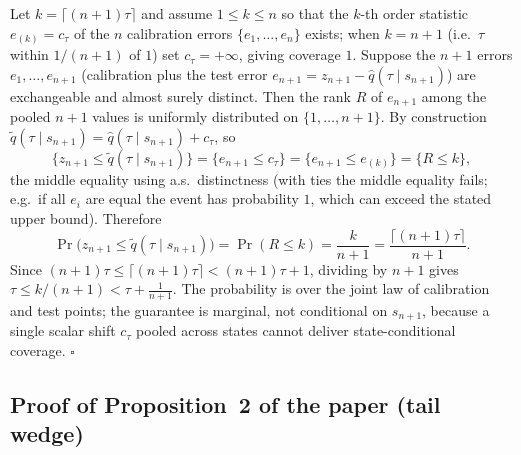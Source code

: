 \documentclass[11pt]{article}
\begin{document}
Let $k=\lceil(n{+}1)\tau\rceil$ and assume $1\le k\le n$ so that the
$k$-th order statistic $e_{(k)}=c_\tau$ of the $n$ calibration errors
$\{e_1,\dots,e_n\}$ exists; when $k=n+1$ (i.e.\ $\tau$ within $1/(n+1)$
of $1$) set $c_\tau=+\infty$, giving coverage $1$. Suppose the $n+1$
errors $e_1,\dots,e_{n+1}$ (calibration plus the test error
$e_{n+1}=z_{n+1}-\widehat q(\tau\mid s_{n+1})$) are exchangeable and
almost surely distinct. Then the rank $R$ of $e_{n+1}$ among the pooled
$n+1$ values is uniformly distributed on $\{1,\dots,n+1\}$. By
construction $\widetilde q(\tau\mid s_{n+1})=\widehat q(\tau\mid
s_{n+1})+c_\tau$, so
\[
\{z_{n+1}\le\widetilde q(\tau\mid s_{n+1})\}
=\{e_{n+1}\le c_\tau\}
=\{e_{n+1}\le e_{(k)}\}
=\{R\le k\},
\]
the middle equality using a.s.\ distinctness (with ties the middle
equality fails; e.g.\ if all $e_i$ are equal the event has probability
$1$, which can exceed the stated upper bound). Therefore
\[
\Pr\big(z_{n+1}\le\widetilde q(\tau\mid s_{n+1})\big)
=\Pr(R\le k)=\frac{k}{n+1}
=\frac{\lceil(n{+}1)\tau\rceil}{n+1}.
\]
Since $(n{+}1)\tau\le\lceil(n{+}1)\tau\rceil<(n{+}1)\tau+1$, dividing by
$n+1$ gives $\tau\le k/(n+1)<\tau+\tfrac1{n+1}$. The probability is over
the joint law of calibration and test points; the guarantee is
marginal, not conditional on $s_{n+1}$, because a single scalar shift
$c_\tau$ pooled across states cannot deliver state-conditional
coverage. \hfill$\square$

\subsection*{Proof of Proposition~2 of the paper (tail wedge)}
\end{document}
